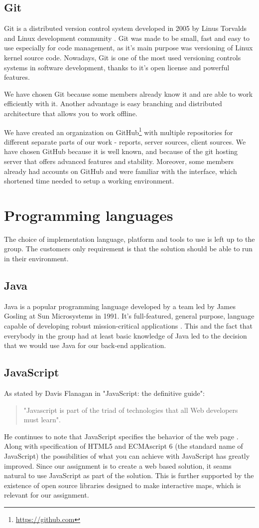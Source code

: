 \documentclass[11pt,a4paper,titlepage,oneside]{report}
\begin{document}
  \subsection{Git}
  Git is a distributed version control system developed in 2005 by Linus Torvalds and Linux development community \cite{ProGit}. Git was made to be small, fast and easy to use especially for code management, as it's main purpose was versioning of Linux kernel source code. Nowadays, Git is one of the most used versioning controls systems in software development, thanks to it's open license and powerful features.

  We have chosen Git because some members already know it and are able to work efficiently with it. Another advantage is easy branching and distributed architecture that allows you to work offline. 
  
  We have created an organization on GitHub\footnote{\url{https://github.com}} with multiple repositories for different separate parts of our work - reports, server sources, client sources. We have chosen GitHub because it is well known, and because of the git hosting server that offers advanced features and stability. Moreover, some members already had accounts on GitHub and were familiar with the interface, which shortened time needed to setup a working environment.

\section{Programming languages}
The choice of implementation language, platform and tools to use is left up to the group. The customers only requirement is that the solution should be able to run in their environment.
  \subsection{Java}
  Java is a popular programming language developed by a team led by James Gosling at Sun Microsystems in 1991. It's full-featured, general purpose, language capable of developing robust mission-critical applications \cite{liang}. This and the fact that everybody in the group had at least basic knowledge of Java led to the decision that we would use Java for our back-end application.  
  \subsection{JavaScript}
  As stated by Davis Flanagan in "JavaScript: the definitive guide": 
  \begin{quote}
  "Javascript is part of the triad of technologies that all Web developers must learn".
  \end{quote} 
  He continues to note that JavaScript specifies the behavior of the web page \cite{fd11}. Along with specification of \gls{HTML5} and ECMAscript 6 (the standard name of JavaScript) the possibilities of what you can achieve with JavaScript has greatly improved. Since our assignment is to create a web based solution, it seams natural to use JavaScript as part of the solution. This is further supported by the existence of open source libraries designed to make interactive maps, which is relevant for our assignment.
\end{document}
